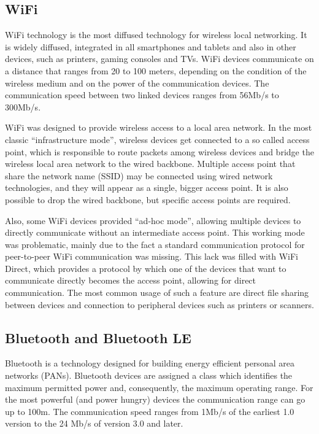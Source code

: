 \documentclass[12pt,a4paper,twoside,openright]{book}
\begin{document}
\subsection{WiFi}

WiFi technology is the most diffused technology for wireless local networking.
%
It is widely diffused, integrated in all smartphones and tablets and also in other devices, such as printers, gaming consoles and TVs.
%
WiFi devices communicate on a distance that ranges from 20 to 100 meters, depending on the condition of the wireless medium and on the power of the communication devices.
%
The communication speed between two linked devices ranges from 56Mb/s to 300Mb/s.

WiFi was designed to provide wireless access to a local area network.
%
In the most classic ``infrastructure mode'', wireless devices get connected to a so called access point, which is responsible to route packets among wireless devices and bridge the wireless local area network to the wired backbone.
%
Multiple access point that share the network name (SSID) may be connected using wired network technologies, and they will appear as a single, bigger access point.
%
It is also possible to drop the wired backbone, but specific access points are required.

Also, some WiFi devices provided ``ad-hoc mode'', allowing multiple devices to directly communicate without an intermediate access point.
%
This working mode was problematic, mainly due to the fact a standard communication protocol for peer-to-peer WiFi communication was missing.
%
This lack was filled with WiFi Direct, which provides a protocol by which one of the devices that want to communicate directly becomes the access point, allowing for direct communication.
%
The most common usage of such a feature are direct file sharing between devices and connection to peripheral devices such as printers or scanners.

\subsection{Bluetooth and Bluetooth LE}

Bluetooth is a technology designed for building energy efficient personal area networks (PANs).
%
Bluetooth devices are assigned a class which identifies the maximum permitted power and, consequently, the maximum operating range.
%
For the most powerful (and power hungry) devices the communication range can go up to 100m.
%
The communication speed ranges from 1Mb/s of the earliest 1.0 version to the 24 Mb/s of version 3.0 and later.
\end{document}
